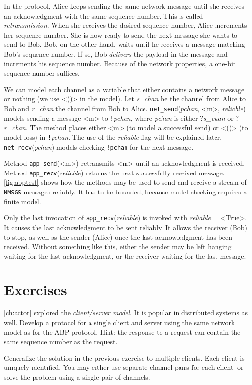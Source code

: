 \documentclass{report}
\begin{document}
{In the protocol, Alice keeps sending the same network message until she
receives an acknowledgment with the same sequence number.
This is called \emph{retransmission}.
%
When she receives the desired sequence number, Alice increments her sequence number.
She is now ready to send the next message she wants to send to Bob.
Bob, on the other hand, waits until he receives a message matching
Bob's sequence number.  If so, Bob \emph{delivers} the payload in the
message and increments his sequence number.
Because of the network properties,  a one-bit sequence number suffices.

We can model each
channel as a variable that either contains a network message or nothing
(we use <{()}> in the model).  Let \textit{s\_chan} be the channel
from Alice to Bob and \textit{r\_chan} the channel from Bob to Alice.
\texttt{net\_send}(\textit{pchan}, <{m}>, \textit{reliable}) models sending
a message <{m}> to
\texttt{!}\textit{pchan}, where \textit{pchan} is either ?\textit{s\_chan}
or ?\textit{r\_chan}.
The method places either <{m}> (to model a successful send)
or <{()}> (to model loss) in \texttt{!}\textit{pchan}.
The use of the \textit{reliable} flag will be explained later.
\texttt{net\_recv}(\textit{pchan}) models checking \texttt{!pchan} for
the next message.

Method \texttt{app\_send}(<{m}>) retransmits <{m}> until
an acknowledgment is received.
Method \texttt{app\_recv}(\textit{reliable}) returns the next successfully received
message.
\autoref{fig:abptest} shows how the methods may be used to send and receive
a stream of \texttt{NMSGS} messages reliably.
It has to be bounded, because model checking requires a finite model.

Only the last invocation of \texttt{app\_recv}(\textit{reliable}) is invoked with
\textit{reliable} = <{True}>.  It causes the last acknowledgment to be sent
reliably.  It allows the receiver (Bob) to stop, as well as the sender (Alice)
once the last acknowledgment has been received.
Without something like this, either the sender may be left hanging waiting
for the last acknowledgment, or the receiver waiting for the last message.

\section*{Exercises}
\begin{problems}
\item \autoref{ch:actor} explored the \emph{client/server model}.  It is popular
in distributed systems as well.
Develop a protocol for a single client and server using the same network
model as for the ABP protocol.
Hint: the response to a request can contain the same sequence number as the
request.
\item Generalize the solution in the previous exercise to multiple clients.
Each client is uniquely identified.  You may either use separate channel pairs
for each client, or solve the problem using a single pair of channels.
\end{problems}

}
\end{document}
